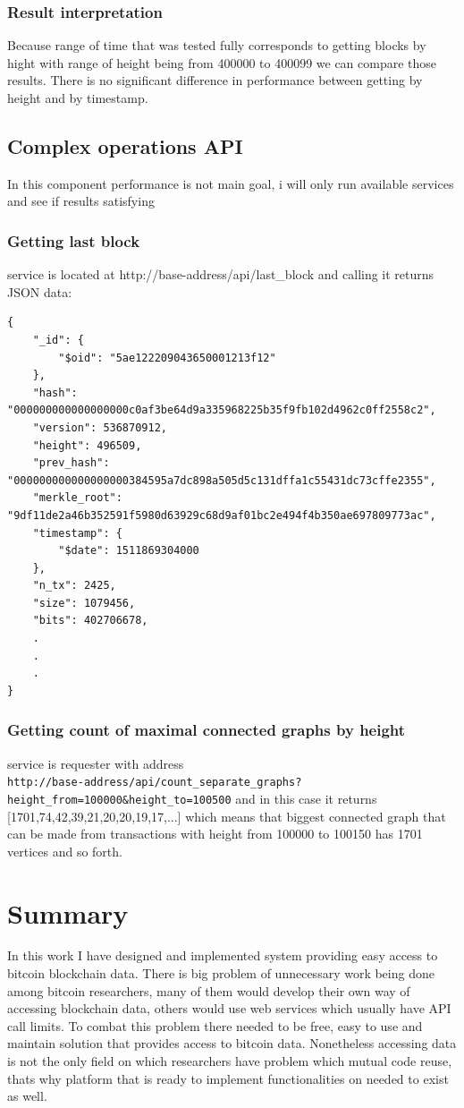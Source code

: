 \documentclass[12pt, en, eng, oneside]{mgr}
\begin{document}
\subsection{Result interpretation}
Because range of time that was tested fully corresponds to getting blocks by hight with range of height being from 400000 to 400099 we can compare those results. There is no significant difference in performance between getting by height and by timestamp.

\section{Complex operations API}
In this component performance is not main goal, i will only run available services and see if results satisfying

\subsection{Getting last block}
service is located at http://base-address/api/last\_block and calling it returns JSON data:
\begin{verbatim}
{
    "_id": {
        "$oid": "5ae122209043650001213f12"
    },
    "hash": "000000000000000000c0af3be64d9a335968225b35f9fb102d4962c0ff2558c2",
    "version": 536870912,
    "height": 496509,
    "prev_hash": "000000000000000000384595a7dc898a505d5c131dffa1c55431dc73cffe2355",
    "merkle_root": "9df11de2a46b352591f5980d63929c68d9af01bc2e494f4b350ae697809773ac",
    "timestamp": {
        "$date": 1511869304000
    },
    "n_tx": 2425,
    "size": 1079456,
    "bits": 402706678,
    .
    .
    .
}
\end{verbatim}

\subsection{Getting count of maximal connected graphs by height}
service is requester with address
\\ \verb|http://base-address/api/count_separate_graphs?height_from=100000&height_to=100500|
and in this case it returns [1701,74,42,39,21,20,20,19,17,...] which means that biggest connected graph that can be made from transactions with height from 100000 to 100150 has 1701 vertices and so forth.




\chapter{Summary}
In this work I have designed and implemented system providing easy access to bitcoin blockchain data. There is big problem of unnecessary work being done among bitcoin researchers, many of them would develop their own way of accessing blockchain data, others would use web services which usually have API call limits. To combat this problem there needed to be free, easy to use and maintain solution that provides access to bitcoin data. 
Nonetheless accessing data is not the only field on which researchers have problem which mutual code reuse, thats why platform that is ready to implement functionalities on needed to exist as well. 
\end{document}
